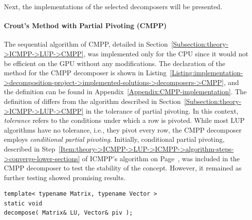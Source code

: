 Next, the implementations of the selected decomposers will be presented.

\paragraph{Crout's Method with Partial Pivoting (CMPP)}\label{Paragraph:implementation->decomposition-project->implemented-solutions->decomposers->CMPP}
The sequential algorithm of CMPP, detailed in Section~\ref{Subsection:theory->ICMPP->LUP->CMPP}, was implemented only for the CPU since it would not be efficient on the GPU without any modifications.
The declaration of the  method for the CMPP decomposer is shown in Listing~\ref{Listing:implementation->decomposition-project->implemented-solutions->decomposers->CMPP}, and the definition can be found in Appendix~\ref{Appendix:CMPP-implementation}.
The definition of  differs from the algorithm described in Section~\ref{Subsection:theory->ICMPP->LUP->CMPP} in the tolerance of partial pivoting.
In this context, \textit{tolerance} refers to the conditions under which a row is pivoted.
While most LUP algorithms have no tolerance, i.e., they pivot every row, the CMPP decomposer employs \textit{conditional partial pivoting}.
Initially, conditional partial pivoting, described in Step~\ref{Item:theory->ICMPP->LUP->ICMPP->algorithm-steps->converge-lower-sections} of ICMPP's algorithm on Page~\pageref{Item:theory->ICMPP->LUP->ICMPP->algorithm-steps->converge-lower-sections}, was included in the CMPP decomposer to test the stability of the concept.
However, it remained as further testing showed promising results.

\begin{lstlisting}[caption={The declaration of the \code{decompose()} method for the CMPP decomposer.
On input, matrix \code{LU} is assumed to contain the values of $\mathbf{A}$, and \code{piv} is expected to be appropriately sized.
On output, matrix \code{LU} contains the values of matrices $\mathbf{L}$ and $\mathbf{U}$ in the format presented in Equation~\ref{Equation:implementation->decomposition-project->implemented-solutions->decomposers->CMPP}, and \code{piv} contains the row permutations in the format set by cuSOLVER and cuBLAS, i.e., row \code{i} was swapped with row \code{piv[ i ]} \cite{5D33zKi5iStCty0r}.
The template parameters, \code{Matrix} and \code{Vector}, are expected to be either \code{TNL::Matrices::DenseMatrix} and \code{TNL::Containers::Vector}, respectively, or types that inherit from them.
},label={Listing:implementation->decomposition-project->implemented-solutions->decomposers->CMPP}]
template< typename Matrix, typename Vector >
static void
decompose( Matrix& LU, Vector& piv );
\end{lstlisting}

